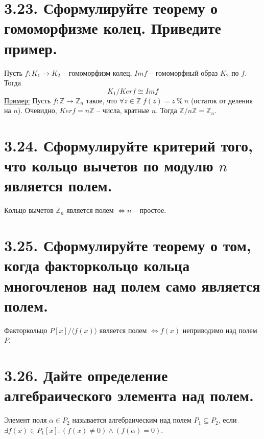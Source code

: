\documentclass{article}
\begin{document}
\section*{\LARGE 3.23. Сформулируйте теорему о гомоморфизме колец. Приведите пример. }
Пусть $f : K_1 \rightarrow K_2$ -- гомоморфизм колец, $Imf$ -- гомоморфный образ $K_2$ по $f$. Тогда
$$K_1 / Kerf \cong Imf$$
\underline{Пример:}
\newline Пусть $f : \mathbb{Z} \rightarrow \mathbb{Z}_n$ такое, что $\forall z \in \mathbb{Z} \; f(z) = z \:\%\: n$ (остаток от деления на $n$). Очевидно, $Kerf = n\mathbb{Z}$ -- числа, кратные $n$. Тогда $\mathbb{Z}/n\mathbb{Z} = \mathbb{Z}_n$.

\section*{\LARGE 3.24. Сформулируйте критерий того, что кольцо вычетов по модулю $n$ является полем. }
Кольцо вычетов $\mathbb{Z}_n$ является полем $\Leftrightarrow n$ -- простое. 

\section*{\LARGE 3.25. Сформулируйте теорему о том, когда факторкольцо кольца многочленов над полем само является полем. }
Факторкольцо $P[x] / \langle f(x)\rangle$ является полем $\Leftrightarrow f(x)$ неприводимо над полем $P$.

\section*{\LARGE 3.26. Дайте определение алгебраического элемента над полем. }
Элемент поля $\alpha \in P_2$ называется алгебраическим над полем $P_1 \subseteq P_2$, если $\exists f(x) \in P_1[x] : (f(x) \ne 0) \wedge (f(\alpha) = 0)$.

\end{document}
